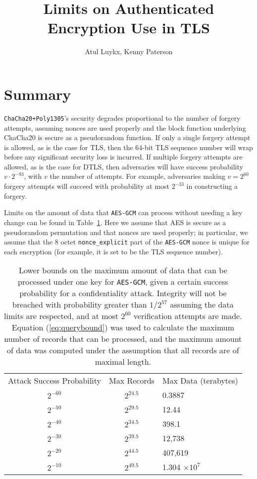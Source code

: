 \documentclass{article}
\title{Limits on Authenticated Encryption Use in TLS}
\author{Atul Luykx, Kenny Paterson}
\begin{document}
\maketitle



\section{Summary}
\texttt{ChaCha20+Poly1305}'s security degrades proportional to the number of forgery attempts, assuming nonces are used properly and the block function underlying ChaCha20 is secure as a pseudorandom function. If only a single forgery attempt is allowed, as is the case for TLS, then the 64-bit TLS sequence number will wrap before any significant security loss is incurred. If multiple forgery attempts are allowed, as is the case for DTLS, then adversaries will have success probability $v\cdot 2^{-93}$, with $v$ the number of attempts. For example, adversaries making $v = 2^{60}$ forgery attempts will succeed with probability at most $2^{-33}$ in constructing a forgery.


Limits on the amount of data that \texttt{AES-GCM} can process without needing a key change can be found in Table~\ref{table:gcm-bounds}. Here we  assume that AES is secure as a pseudorandom permutation and that nonces are used properly; in particular, we assume that the 8 octet \verb|nonce_explicit| part of the \texttt{AES-GCM} nonce is unique for each encryption (for example, it is set to be the TLS sequence number). 


\medskip
\begin{table}[H]
  \centering
  \caption{Lower bounds on the maximum amount of data that can be processed under one key for \texttt{AES-GCM}, given a certain success probability for a confidentiality attack. Integrity will not be breached with probability greater than $1/2^{57}$ assuming the data limits are respected, and at most $2^{60}$ verification attempts are made. Equation (\ref{eq:querybound}) was used to calculate the maximum number of records that can be processed, and the maximum amount of data was computed under the assumption that all records are of maximal length.}\label{table:gcm-bounds}
  \begin{tabular}{ccl}
    \toprule
    Attack Success Probability  & Max Records & Max Data (terabytes)\\
    \cmidrule{1-3}
    $2^{-60}$ & $2^{24.5}$ & 0.3887\\
    $2^{-50}$ & $2^{29.5}$ & 12.44 \\
    $2^{-40}$ & $2^{34.5}$ & 398.1\\
    $2^{-30}$ & $2^{39.5}$ & 12,738\\
    $2^{-20}$ & $2^{44.5}$ & 407,619\\
    $2^{-10}$ & $2^{49.5}$ & 1.304 $\times 10^7$\\
    \bottomrule
  \end{tabular}
\end{table}
\medskip
\end{document}
